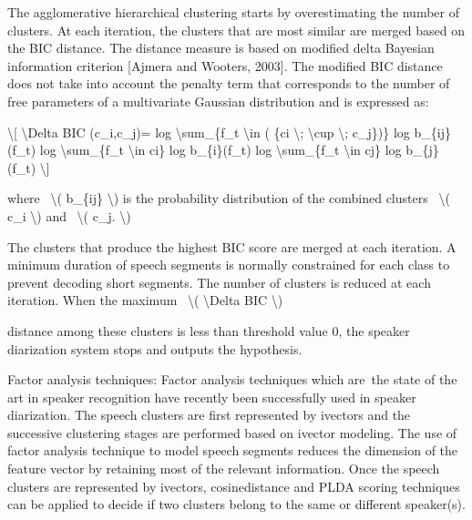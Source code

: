 \documentclass[letterpaper,10pt,english]{jupyterBook}
\begin{document}
\sphinxAtStartPar
The agglomerative hierarchical clustering starts by overestimating the
number of clusters. At each iteration, the clusters that are most
similar are merged based on the BIC distance. The distance measure is
based on modified delta Bayesian information criterion {[}Ajmera and
Wooters, 2003{]}. The modified BIC distance does not take into account
the penalty term that corresponds to the number of free parameters of a
multivariate Gaussian distribution and is expressed as:

\sphinxAtStartPar
\textbackslash{}{[} \textbackslash{}Delta BIC (c\_i,c\_j)= log \textbackslash{}sum\_\{f\_t \textbackslash{}in ( \{ci \textbackslash{}; \textbackslash{}cup \textbackslash{};
c\_j\})\} log b\_\{ij\}(f\_t) \sphinxhyphen{} log \textbackslash{}sum\_\{f\_t \textbackslash{}in ci\} log b\_\{i\}(f\_t) \sphinxhyphen{} log
\textbackslash{}sum\_\{f\_t \textbackslash{}in cj\} log b\_\{j\}(f\_t) \textbackslash{}{]}

\sphinxAtStartPar
where  \textbackslash{}( b\_\{ij\} \textbackslash{}) is the probability distribution of the combined
clusters  \textbackslash{}( c\_i \textbackslash{}) and  \textbackslash{}( c\_j. \textbackslash{})

\sphinxAtStartPar
The clusters that produce the highest BIC score are merged at each
iteration. A minimum duration of speech segments is normally constrained
for each class to prevent decoding short segments. The number of
clusters is reduced at each iteration. When the maximum  \textbackslash{}( \textbackslash{}Delta BIC
\textbackslash{})

\sphinxAtStartPar
distance among these clusters is less than threshold value 0, the
speaker diarization system stops and outputs the hypothesis.

\sphinxAtStartPar
Factor analysis techniques: Factor analysis techniques which are the
state of the art in speaker recognition have recently been successfully
used in speaker diarization. The speech clusters are first represented
by i\sphinxhyphen{}vectors and the successive clustering stages are performed based on
i\sphinxhyphen{}vector modeling. The use of factor analysis technique to model speech
segments reduces the dimension of the feature vector by retaining most
of the relevant information. Once the speech clusters are represented by
i\sphinxhyphen{}vectors, cosine\sphinxhyphen{}distance and PLDA scoring techniques can be applied to
decide if two clusters belong to the same or different speaker(s).
\end{document}
